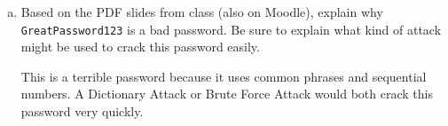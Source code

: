 \documentclass[12pt]{amsart}
\theoremstyle{plain}
\theoremstyle{definition}
\begin{document}
\begin{enumerate}[1.]
\begin{enumerate}[a.]
\begin{framed}
		\end{framed}
		\newpage \item Based on the PDF slides from class (also on Moodle), explain why \texttt{GreatPassword123} is a bad password.  Be sure to explain what kind of attack might be used to crack this password easily.
		\begin{framed}
		This is a terrible password because it uses common phrases and sequential numbers.  A Dictionary Attack or Brute Force Attack would both crack this password very quickly.
		\end{framed}
		\end{enumerate}
\end{enumerate}
	
\end{document}

